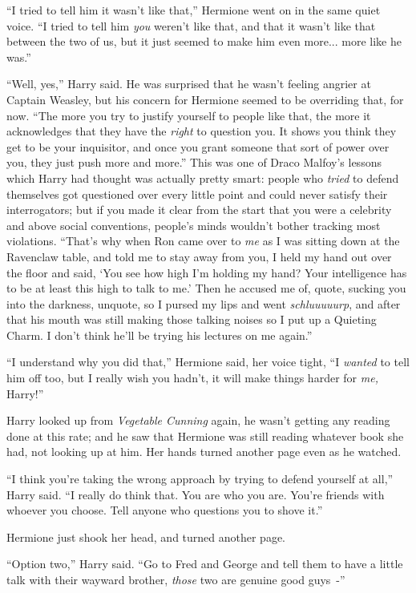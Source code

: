 ``I tried to tell him it wasn't like that,'' Hermione went on in the same quiet voice. ``I tried to tell him \emph{you} weren't like that, and that it wasn't like that between the two of us, but it just seemed to make him even more... more like he was.''

``Well, yes,'' Harry said. He was surprised that he wasn't feeling angrier at Captain Weasley, but his concern for Hermione seemed to be overriding that, for now. ``The more you try to justify yourself to people like that, the more it acknowledges that they have the \emph{right} to question you. It shows you think they get to be your inquisitor, and once you grant someone that sort of power over you, they just push more and more.'' This was one of Draco Malfoy's lessons which Harry had thought was actually pretty smart: people who \emph{tried} to defend themselves got questioned over every little point and could never satisfy their interrogators; but if you made it clear from the start that you were a celebrity and above social conventions, people's minds wouldn't bother tracking most violations. ``That's why when Ron came over to \emph{me} as I was sitting down at the Ravenclaw table, and told me to stay away from you, I held my hand out over the floor and said, `You see how high I'm holding my hand? Your intelligence has to be at least this high to talk to me.' Then he accused me of, quote, sucking you into the darkness, unquote, so I pursed my lips and went \emph{schluuuuurp}, and after that his mouth was still making those talking noises so I put up a Quieting Charm. I don't think he'll be trying his lectures on me again.''

``I understand why you did that,'' Hermione said, her voice tight, ``I \emph{wanted} to tell him off too, but I really wish you hadn't, it will make things harder for \emph{me,} Harry!''

Harry looked up from \emph{Vegetable Cunning} again, he wasn't getting any reading done at this rate; and he saw that Hermione was still reading whatever book she had, not looking up at him. Her hands turned another page even as he watched.

``I think you're taking the wrong approach by trying to defend yourself at all,'' Harry said. ``I really do think that. You are who you are. You're friends with whoever you choose. Tell anyone who questions you to shove it.''

Hermione just shook her head, and turned another page.

``Option two,'' Harry said. ``Go to Fred and George and tell them to have a little talk with their wayward brother, \emph{those} two are genuine good guys~-''

